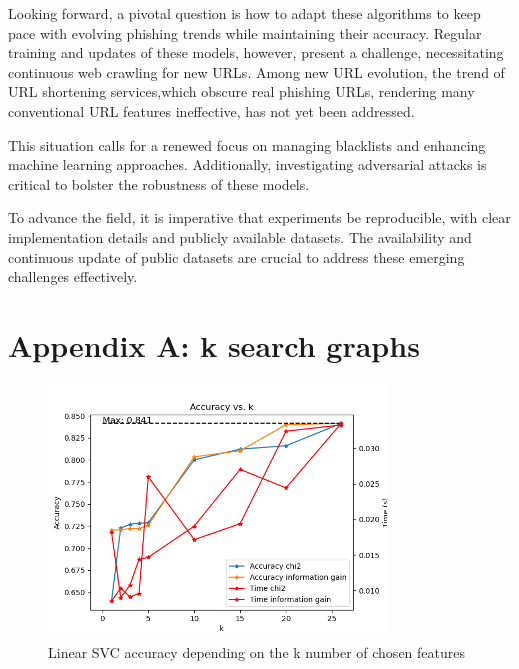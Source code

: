\documentclass{article}
\begin{document}
    Looking forward, a pivotal question is how to adapt these algorithms to keep pace with evolving phishing trends while maintaining their accuracy.
    Regular training and updates of these models, however, present a challenge, necessitating continuous web crawling for new URLs.
    Among new URL evolution, the trend of URL shortening services,which obscure real phishing URLs, rendering many conventional URL features ineffective, has not yet been addressed.

    This situation calls for a renewed focus on managing blacklists and enhancing machine learning approaches.
    Additionally, investigating adversarial attacks is critical to bolster the robustness of these models.

    To advance the field, it is imperative that experiments be reproducible, with clear implementation details and publicly available datasets.
    The availability and continuous update of public datasets are crucial to address these emerging challenges effectively.

    
    

    \appendix


    \section{Appendix A: k search graphs}\label{sec:appendixA}

    \begin{figure}[H]
        \centering
        \includegraphics[width=0.8\textwidth]{report_img/k_search/linear_svc}
        \caption{Linear SVC accuracy depending on the k number of chosen features}
        \label{fig:}
    \end{figure}
\end{document}
